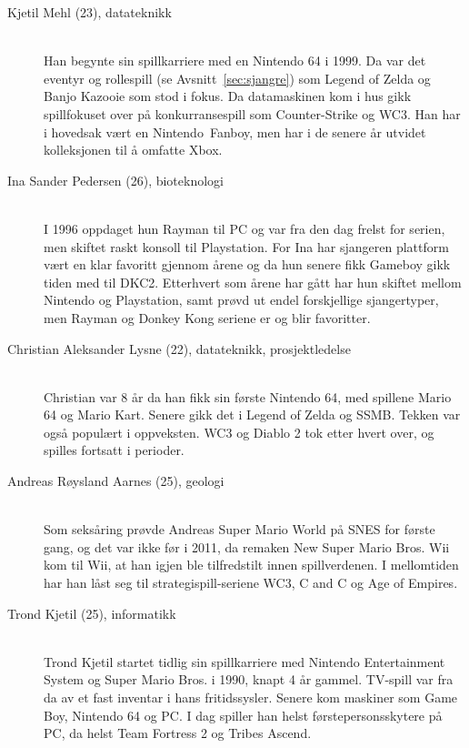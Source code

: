 \begin{description}
\item[Kjetil Mehl (23), datateknikk] \hfill \\
Han begynte sin spillkarriere med en \gls{Nintendo 64} i 1999. Da
var det eventyr og rollespill (se Avsnitt~\ref{sec:sjangre}) som
\gls{Legend of Zelda} og \gls{Banjo Kazooie} som
stod i fokus. Da datamaskinen kom i hus gikk spillfokuset  over på
konkurransespill som Counter-Strike og \gls{WC3}. Han har i hovedsak vært
en Nintendo~\gls{Fanboy}, men har i de senere år utvidet
kolleksjonen til å omfatte Xbox.

\item[Ina Sander Pedersen (26), bioteknologi] \hfill \\
I 1996 oppdaget hun \gls{Rayman} til PC og var fra den dag frelst for
serien, men skiftet raskt konsoll til Playstation. For Ina har sjangeren
plattform vært en klar favoritt gjennom årene og da hun senere fikk
\gls{Gameboy} gikk tiden med til \gls{DKC2}. Etterhvert som årene har gått har hun skiftet mellom
Nintendo og Playstation, samt prøvd ut endel forskjellige sjangertyper,
men Rayman og Donkey Kong seriene er og blir favoritter. 

\item[Christian Aleksander Lysne (22), datateknikk, prosjektledelse] \hfill \\
Christian var 8 år da han fikk sin første \gls{Nintendo 64}, med
spillene \gls{Mario 64} og \gls{Mario Kart}.
Senere gikk det i \gls{Legend of Zelda}  og \gls{SSMB}.
\gls{Tekken} var også  populært i oppveksten. \gls{WC3} og
\gls{Diablo 2} tok etter hvert over, og spilles fortsatt i perioder.

\item[Andreas Røysland Aarnes (25), geologi] \hfill \\
Som seksåring prøvde Andreas \gls{Super Mario World} på
\gls{SNES} for første gang, og det var ikke før
i 2011, da remaken New Super Mario Bros. Wii kom til
\gls{Wii}, at han igjen ble tilfredstilt innen
spillverdenen. I mellomtiden har han låst seg til strategispill-seriene
\gls{WC3}, \gls{C and C} og Age of
Empires\cite{aoe}. 

\item[Trond Kjetil (25), informatikk] \hfill \\
Trond Kjetil startet tidlig sin spillkarriere med Nintendo Entertainment System og Super Mario Bros. i 1990, knapt 4 år gammel. TV-spill var fra da av et fast inventar i hans fritidssysler. Senere kom maskiner som Game Boy, Nintendo 64 og PC. I dag spiller han helst førstepersonsskytere på PC, da helst Team Fortress 2 og Tribes Ascend.
\end{description}

